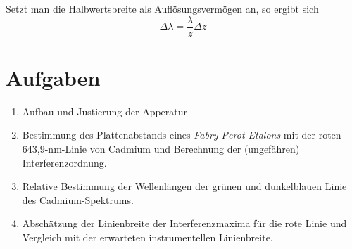 \documentclass[a4paper,german,12pt,smallheadings]{scrartcl}
\begin{document}
Setzt man die Halbwertsbreite als Auflösungsvermögen an, so ergibt sich
\begin{equation}
  \Delta \lambda = \frac{\lambda}{z} \Delta z
\end{equation}

\newpage
\section{Aufgaben}
\begin{enumerate}
  \item Aufbau und Justierung der Apperatur
  \item Bestimmung des Plattenabstands eines \textit{Fabry-Perot-Etalons} mit
    der roten 643{,}9-nm-Linie von Cadmium und Berechnung der (ungefähren)
    Interferenzordnung.
  \item Relative Bestimmung der Wellenlängen der grünen und dunkelblauen Linie
    des Cadmium-Spektrums.
  \item Abschätzung der Linienbreite der Interferenzmaxima für die rote Linie
    und Vergleich mit der erwarteten instrumentellen Linienbreite.
\end{enumerate}
\end{document}
